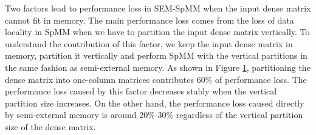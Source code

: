 Two factors lead to performance loss in SEM-SpMM when the input dense matrix
cannot fit in memory. The main performance loss comes from the loss of data
locality in SpMM when we have to partition the input dense matrix vertically.
To understand
the contribution of this factor, we keep the input dense matrix in memory,
partition it vertically and perform SpMM with the vertical partitions in
the same fashion as semi-external memory. As shown in Figure \ref{perf:spmm32},
partitioning the dense matrix into one-column matrices contributes 60\%
of performance loss. The performance loss caused by this factor decreases
stably when the vertical partition size increases. On the other hand,
the performance loss caused directly by semi-external memory is around 20\%-30\%
regardless of the vertical partition size of the dense matrix.

\begin{figure}
	\begin{center}
		\footnotesize
		
		\caption{}
		\label{perf:spmm32}
	\end{center}
\end{figure}

%	
%	

%		
%		

